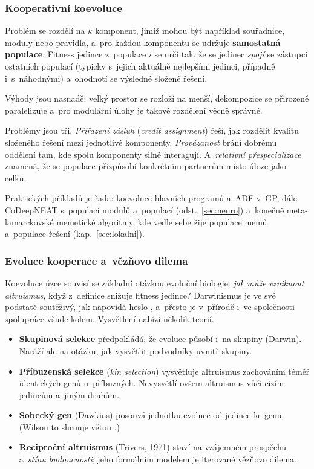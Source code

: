\documentclass[11pt,a4paper]{article}
\theoremstyle{definition}
\begin{document}
\subsubsection{Kooperativní koevoluce}

\begin{defbox}
Problém se rozdělí na $k$ komponent, jimiž mohou být například souřadnice, moduly nebo
pravidla, a~pro každou komponentu se udržuje \textbf{samostatná populace}. Fitness jedince
z~populace $i$ se určí tak, že se jedinec \emph{spojí} se zástupci ostatních populací
(typicky s~jejich aktuálně nejlepšími jedinci, případně i~s~náhodnými) a~ohodnotí se
výsledné složené řešení.
\end{defbox}

Výhody jsou nasnadě: velký prostor se rozloží na menší, dekompozice se přirozeně
paralelizuje a~pro modulární úlohy je takové rozdělení věcně správné.

Problémy jsou tři. \emph{Přiřazení zásluh} (\emph{credit assignment}) řeší, jak rozdělit
kvalitu složeného řešení mezi jednotlivé komponenty. \emph{Provázanost} brání dobrému
oddělení tam, kde spolu komponenty silně interagují. A~\emph{relativní přespecializace}
znamená, že se populace přizpůsobí konkrétním partnerům místo úloze jako celku.

Praktických příkladů je řada: koevoluce hlavních programů a~ADF v~GP, dále CoDeepNEAT
s~populací modulů a~populací  (odst.~\ref{sec:neuro}) a~konečně
meta-lamarckovské memetické algoritmy, kde vedle sebe žije populace memů a~populace řešení
(kap.~\ref{sec:lokalni}).

\subsubsection{Evoluce kooperace a~vězňovo dilema}

Koevoluce úzce souvisí se základní otázkou evoluční biologie: \emph{jak může vzniknout
altruismus}, když z~definice snižuje fitness jedince? Darwinismus je ve své podstatě
soutěživý, jak napovídá heslo , a~přesto je v~přírodě
i~ve společnosti spolupráce všude kolem. Vysvětlení nabízí několik teorií.

\begin{itemize}
\item \textbf{Skupinová selekce} předpokládá, že evoluce působí i~na skupiny (Darwin).
  Naráží ale na otázku, jak vysvětlit podvodníky uvnitř skupiny.
\item \textbf{Příbuzenská selekce} (\emph{kin selection}) vysvětluje altruismus zachováním
  téměř identických genů u~příbuzných. Nevysvětlí ovšem altruismus vůči cizím jedincům
  a~jiným druhům.
\item \textbf{Sobecký gen} (Dawkins) posouvá jednotku evoluce od jedince ke genu.
  (Wilson to shrnuje větou .)
\item \textbf{Reciproční altruismus} (Trivers, 1971) staví na vzájemném prospěchu
  a~\emph{stínu budoucnosti}; jeho formálním modelem je iterované vězňovo dilema.
\end{itemize}
\end{document}

